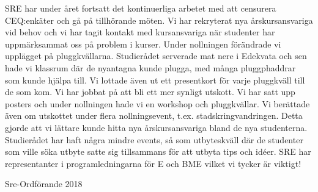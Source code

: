 \documentclass[../_main/handlingar.tex]{subfiles}
\begin{document}

SRE har under året fortsatt det kontinuerliga arbetet med att censurera CEQ:enkäter och gå på tillhörande möten. Vi har rekryterat nya årskursansvariga vid behov och vi har tagit kontakt med kursansvariga när studenter har uppmärksammat oss på problem i kurser.
Under nollningen förändrade vi upplägget på pluggkvällarna. Studierådet serverade mat nere i Edekvata och sen hade vi klassrum där de nyantagna kunde plugga, med många pluggphaddrar som kunde hjälpa till. Vi lottade även ut ett presentkort för varje pluggkväll till de som kom.
Vi har jobbat på att bli ett mer synligt utskott. Vi har satt upp posters och under nollningen hade vi en workshop och pluggkvällar. Vi berättade även om utskottet under flera nollningsevent, t.ex. stadskringvandringen. Detta gjorde att vi lättare kunde hitta nya årskursansvariga bland de nya studenterna. 
Studierådet har haft några mindre events, så som utbyteskväll där de studenter som ville söka utbyte satte sig tillsammans för att utbyta tips och idéer.
SRE har representanter i programledningarna för E och BME vilket vi tycker är viktigt!



\begin{signatures}{1}
    \mvh
    \signature{Fanny Månefjord}{Sre-Ordförande 2018}
\end{signatures}
\end{document}
